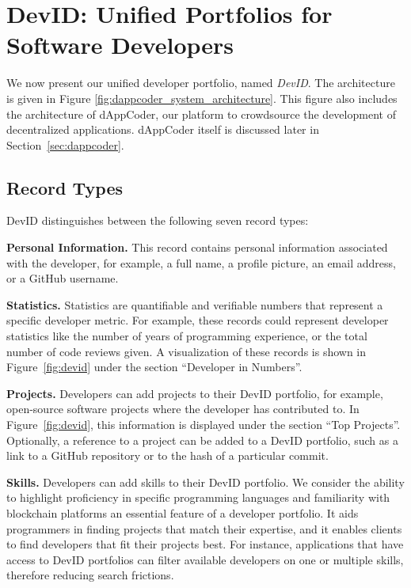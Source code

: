 \section{DevID: Unified Portfolios for Software Developers}
\label{sec:devid_architecture}
We now present our unified developer portfolio, named \emph{DevID}.
The architecture is given in Figure \ref{fig:dappcoder_system_architecture}.
This figure also includes the architecture of dAppCoder, our platform to crowdsource the development of decentralized applications.
dAppCoder itself is discussed later in Section~\ref{sec:dappcoder}.

\subsection{Record Types}
\label{subsec:record_types}
DevID distinguishes between the following seven record types:

\textbf{Personal Information.}
This record contains personal information associated with the developer, for example, a full name, a profile picture, an email address, or a GitHub username.

\textbf{Statistics.}
Statistics are quantifiable and verifiable numbers that represent a specific developer metric.
For example, these records could represent developer statistics like the number of years of programming experience, or the total number of code reviews given.
A visualization of these records is shown in Figure~\ref{fig:devid} under the section \enquote{Developer in Numbers}.

\textbf{Projects.}
Developers can add projects to their DevID portfolio, for example, open-source software projects where the developer has contributed to.
In Figure~\ref{fig:devid}, this information is displayed under the section \enquote{Top Projects}.
Optionally, a reference to a project can be added to a DevID portfolio, such as a link to a GitHub repository or to the hash of a particular commit.

\textbf{Skills.}
Developers can add skills to their DevID portfolio.
We consider the ability to highlight proficiency in specific programming languages and familiarity with blockchain platforms an essential feature of a developer portfolio.
It aids programmers in finding projects that match their expertise, and it enables clients to find developers that fit their projects best.
For instance, applications that have access to DevID portfolios can filter available developers on one or multiple skills, therefore reducing search frictions.

